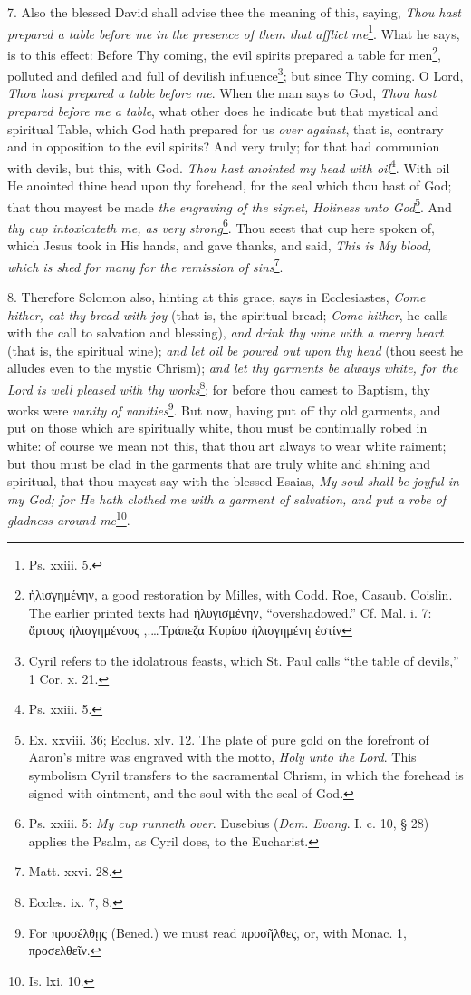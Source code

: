 7. Also the blessed David shall advise thee the meaning of this, saying, \emph{Thou hast prepared a table before me in the presence of them that afflict me}\footnote{Ps. xxiii. 5.}. What he says, is to this effect: Before Thy coming, the evil spirits prepared a table for men\footnote{\textgreek{ἠλισγημένην}, a good restoration by Milles, with Codd. Roe, Casaub. Coislin. The earlier printed texts had \textgreek{ἠλυγισμένην}, “overshadowed.” Cf. Mal. i. 7: \textgreek{ἄρτους ἠλισγημένους ,}.…\textgreek{Τράπεζα Κυρίου ἠλισγημένη ἐστίν}}, polluted and defiled and full of devilish influence\footnote{Cyril refers to the idolatrous feasts, which St. Paul calls “the table of devils,” 1 Cor. x. 21.}; but since Thy coming. O Lord, \emph{Thou hast prepared a table before me}. When the man says to God, \emph{Thou hast prepared before me a table}, what other does he indicate but that mystical and spiritual Table, which God hath prepared for us \emph{over against}, that is, contrary and in opposition to the evil spirits? And very truly; for that had communion with devils, but this, with God. \emph{Thou hast anointed my head with oil}\footnote{Ps. xxiii. 5.}. With oil He anointed thine head upon thy forehead, for the seal which thou hast of God; that thou mayest be made \emph{the engraving of the signet, Holiness unto God}\footnote{Ex. xxviii. 36; Ecclus. xlv. 12. The plate of pure gold on the forefront of Aaron’s mitre was engraved with the motto, \emph{Holy unto the Lord}. This symbolism Cyril transfers to the sacramental Chrism, in which the forehead is signed with ointment, and the soul with the seal of God.}. And \emph{thy cup intoxicateth me, as very strong}\footnote{Ps. xxiii. 5: \emph{My cup runneth over}. Eusebius (\emph{Dem. Evang}. I. c. 10, § 28) applies the Psalm, as Cyril does, to the Eucharist.}. Thou seest that cup here spoken of, which Jesus took in His hands, and gave thanks, and said, \emph{This is My blood, which is shed for many for the remission of sins}\footnote{Matt. xxvi. 28.}.

8. Therefore Solomon also, hinting at this grace, says in Ecclesiastes, \emph{Come hither, eat thy bread with joy} (that is, the spiritual bread; \emph{Come hither}, he calls with the call to salvation and blessing), \emph{and drink thy wine with a merry heart} (that is, the spiritual wine); \emph{and let oil be poured out upon thy head} (thou seest he alludes even to the mystic Chrism); \emph{and let thy garments be always white, for the Lord is well pleased with thy works}\footnote{Eccles. ix. 7, 8.}; for before thou camest to Baptism, thy works were \emph{vanity of vanities}\footnote{For \textgreek{προσέλθῃς} (Bened.) we must read \textgreek{προσῆλθες}, or, with Monac. 1, \textgreek{προσελθεῖν}.}. But now, having put off thy old garments, and put on those which are spiritually white, thou must be continually robed in white: of course we mean not this, that thou art always to wear white raiment; but thou must be clad in the garments that are truly white and shining and spiritual, that thou mayest say with the blessed Esaias, \emph{My soul shall be joyful in my God; for He hath clothed me with a garment of salvation, and put a robe of gladness around me}\footnote{Is. lxi. 10.}.


